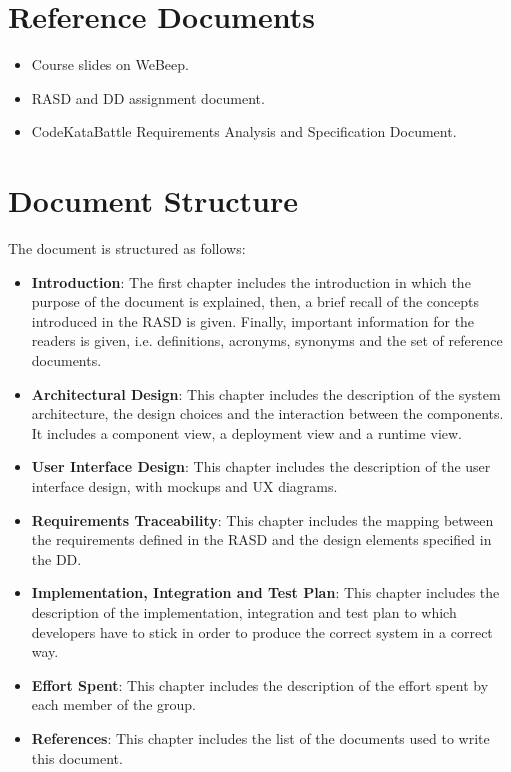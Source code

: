 
\section{Reference Documents}
\begin{itemize}
    \item Course slides on WeBeep. 
    \item RASD and DD assignment document.
    \item CodeKataBattle Requirements Analysis and Specification Document.
\end{itemize}

\section{Document Structure}
The document is structured as follows:
\begin{itemize}
    \item \textbf{Introduction}: The first chapter includes the introduction in which the purpose of the document is explained, then, a brief recall of the concepts introduced in the RASD is given.
    Finally, important information for the readers is given, i.e. definitions, acronyms, synonyms and the set of reference documents.
    \item \textbf{Architectural Design}: This chapter includes the description of the system architecture, the design choices and the interaction between the components. It includes a component view, a deployment view and a runtime view.
    \item \textbf{User Interface Design}: This chapter includes the description of the user interface design, with mockups and UX diagrams.
    \item \textbf{Requirements Traceability}: This chapter includes the mapping between the requirements defined in the RASD and the design elements specified in the DD.
    \item \textbf{Implementation, Integration and Test Plan}: This chapter includes the description of the implementation, integration and test plan to which developers have to stick in order to produce the correct system in a correct way.
    \item \textbf{Effort Spent}: This chapter includes the description of the effort spent by each member of the group.
    \item \textbf{References}: This chapter includes the list of the documents used to write this document.
\end{itemize}